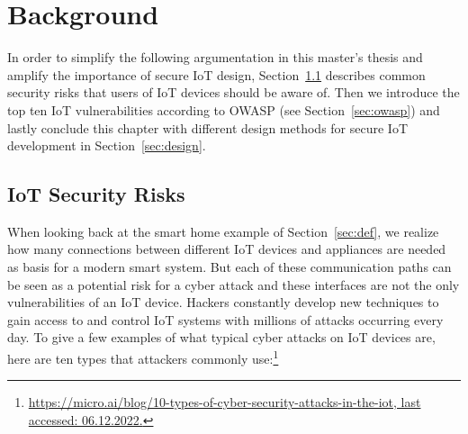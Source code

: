 
\chapter{Background}\label{ch:background}
In order to simplify the following argumentation in this master's thesis and amplify the importance of secure IoT design, Section~\ref{sec:iot-risks} describes common security risks that users of IoT devices should be aware of. Then we introduce the top ten IoT vulnerabilities according to OWASP (see Section~\ref{sec:owasp}) and lastly conclude this chapter with different design methods for secure IoT development in Section~\ref{sec:design}. 


\section{IoT Security Risks}\label{sec:iot-risks}
When looking back at the smart home example of Section~\ref{sec:def}, we realize how many connections between different IoT devices and appliances are needed as basis for a modern smart system. But each of these communication paths can be seen as a potential risk for a cyber attack and these interfaces are not the only vulnerabilities of an IoT device. Hackers constantly develop new techniques to gain access to and control IoT systems with millions of attacks occurring every day. To give a few examples of what typical cyber attacks on IoT devices are, here are ten types that attackers commonly use:\footnote{\href{https://micro.ai/blog/10-types-of-cyber-security-attacks-in-the-iot}{https://micro.ai/blog/10-types-of-cyber-security-attacks-in-the-iot, last accessed: 06.12.2022.}} 
